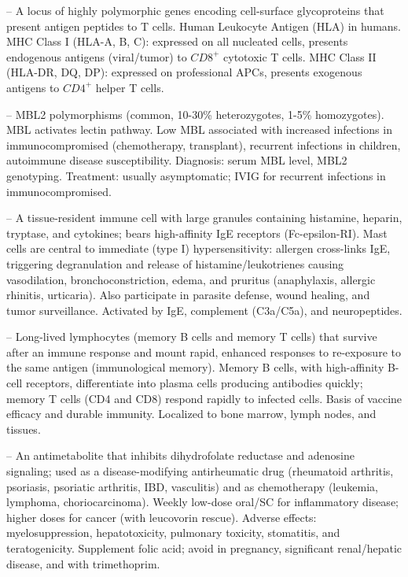 -- A locus of highly polymorphic genes encoding cell-surface glycoproteins that present antigen peptides to T cells. Human Leukocyte Antigen (HLA) in humans. MHC Class I (HLA-A, B, C): expressed on all nucleated cells, presents endogenous antigens (viral/tumor) to $CD8^+$ cytotoxic T cells. MHC Class II (HLA-DR, DQ, DP): expressed on professional APCs, presents exogenous antigens to $CD4^+$ helper T cells.

-- MBL2 polymorphisms (common, 10-30\% heterozygotes, 1-5\% homozygotes). MBL activates lectin pathway. Low MBL associated with increased infections in immunocompromised (chemotherapy, transplant), recurrent infections in children, autoimmune disease susceptibility. Diagnosis: serum MBL level, MBL2 genotyping. Treatment: usually asymptomatic; IVIG for recurrent infections in immunocompromised.

-- A tissue-resident immune cell with large granules containing histamine, heparin, tryptase, and cytokines; bears high-affinity IgE receptors (Fc-epsilon-RI). Mast cells are central to immediate (type I) hypersensitivity: allergen cross-links IgE, triggering degranulation and release of histamine/leukotrienes causing vasodilation, bronchoconstriction, edema, and pruritus (anaphylaxis, allergic rhinitis, urticaria). Also participate in parasite defense, wound healing, and tumor surveillance. Activated by IgE, complement (C3a/C5a), and neuropeptides.

-- Long-lived lymphocytes (memory B cells and memory T cells) that survive after an immune response and mount rapid, enhanced responses to re-exposure to the same antigen (immunological memory). Memory B cells, with high-affinity B-cell receptors, differentiate into plasma cells producing antibodies quickly; memory T cells (CD4 and CD8) respond rapidly to infected cells. Basis of vaccine efficacy and durable immunity. Localized to bone marrow, lymph nodes, and tissues.

-- An antimetabolite that inhibits dihydrofolate reductase and adenosine signaling; used as a disease-modifying antirheumatic drug (rheumatoid arthritis, psoriasis, psoriatic arthritis, IBD, vasculitis) and as chemotherapy (leukemia, lymphoma, choriocarcinoma). Weekly low-dose oral/SC for inflammatory disease; higher doses for cancer (with leucovorin rescue). Adverse effects: myelosuppression, hepatotoxicity, pulmonary toxicity, stomatitis, and teratogenicity. Supplement folic acid; avoid in pregnancy, significant renal/hepatic disease, and with trimethoprim.


